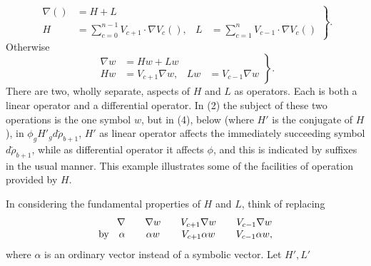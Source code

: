 \documentclass[11pt]{article}
\begin{document}
\begin{equation}\left.\begin{aligned}\nabla()&=H+L\\H&=\sum_{c=0}^{n-1}V_{c+1}\cdot\nabla V_c(),&L&=\sum_{c=1}^{n}V_{c-1}\cdot\nabla V_c()\end{aligned}\right\}.\tag{1}\end{equation}
Otherwise
\begin{equation}\left.\begin{aligned}\nabla w&=Hw+Lw\\Hw&=V_{c+1}\nabla w,&Lw&=V_{c-1}\nabla w\end{aligned}\right\}.\tag{2}\end{equation}
There are two, wholly separate, aspects of $H$ and $L$ as operators. Each is both a linear operator and a differential operator. In (2) the subject of these two operations is the one symbol $w$, but in (4), below (where $H'$ is the conjugate of $H$), in $\phi_gH'_gd\breve\rho_{b+1}$, $H'$ as linear operator affects the immediately succeeding symbol $d\breve\rho_{b+1}$, while as differential operator it affects $\phi$, and this is indicated by suffixes in the usual manner. This example illustrates some of the facilities of operation provided by $H$.


\indent In considering the fundamental properties of $H$ and $L$, think of replacing
\[
\begin{array}{r@{\qquad}c@{\qquad}c@{\qquad}c}
  \nabla & \nabla w & V_{c+1}\nabla w & V_{c-1}\nabla w \\
  \text{by}\quad\alpha & \alpha w & V_{c+1}\alpha w & V_{c-1}\alpha w,
\end{array}
\]
where $\alpha$ is an ordinary vector instead of a symbolic vector. Let $H',L'$
\end{document}
